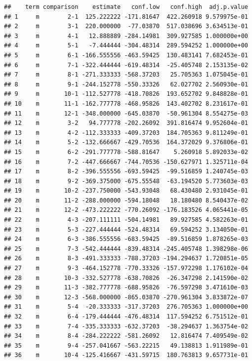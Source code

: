 \documentclass[]{book}
\theoremstyle{definition}
\theoremstyle{definition}
\theoremstyle{remark}
\begin{document}
\begin{verbatim}
##    term comparison    estimate   conf.low   conf.high  adj.p.value
## 1     m        2-1  125.222222 -171.81647  422.260918 9.579975e-01
## 2     m        3-1  220.000000  -77.03870  517.038696 3.634513e-01
## 3     m        4-1   12.888889 -284.14981  309.927585 1.000000e+00
## 4     m        5-1   -7.444444 -304.48314  289.594252 1.000000e+00
## 5     m        6-1 -166.555556 -463.59425  130.483141 7.682453e-01
## 6     m        7-1 -322.444444 -619.48314  -25.405748 2.153135e-02
## 7     m        8-1 -271.333333 -568.37203   25.705363 1.075045e-01
## 8     m        9-1 -244.152778 -550.33326   62.027702 2.560930e-01
## 9     m       10-1 -112.527778 -418.70826  193.652702 9.848828e-01
## 10    m       11-1 -162.777778 -468.95826  143.402702 8.231617e-01
## 11    m       12-1 -348.000000 -645.03870  -50.961304 8.554275e-03
## 12    m        3-2   94.777778 -202.26092  391.816474 9.952604e-01
## 13    m        4-2 -112.333333 -409.37203  184.705363 9.811249e-01
## 14    m        5-2 -132.666667 -429.70536  164.372029 9.376806e-01
## 15    m        6-2 -291.777778 -588.81647    5.260918 5.892033e-02
## 16    m        7-2 -447.666667 -744.70536 -150.627971 1.325711e-04
## 17    m        8-2 -396.555556 -693.59425  -99.516859 1.240745e-03
## 18    m        9-2 -369.375000 -675.55548  -63.194520 5.773603e-03
## 19    m       10-2 -237.750000 -543.93048   68.430480 2.931045e-01
## 20    m       11-2 -288.000000 -594.18048   18.180480 8.540437e-02
## 21    m       12-2 -473.222222 -770.26092 -176.183526 4.065441e-05
## 22    m        4-3 -207.111111 -504.14981   89.927585 4.582263e-01
## 23    m        5-3 -227.444444 -524.48314   69.594252 3.134050e-01
## 24    m        6-3 -386.555556 -683.59425  -89.516859 1.878265e-03
## 25    m        7-3 -542.444444 -839.48314 -245.405748 1.398298e-06
## 26    m        8-3 -491.333333 -788.37203 -194.294637 1.720851e-05
## 27    m        9-3 -464.152778 -770.33326 -157.972298 1.176102e-04
## 28    m       10-3 -332.527778 -638.70826  -26.347298 2.141590e-02
## 29    m       11-3 -382.777778 -688.95826  -76.597298 3.471610e-03
## 30    m       12-3 -568.000000 -865.03870 -270.961304 3.833872e-07
## 31    m        5-4  -20.333333 -317.37203  276.705363 1.000000e+00
## 32    m        6-4 -179.444444 -476.48314  117.594252 6.751512e-01
## 33    m        7-4 -335.333333 -632.37203  -38.294637 1.363754e-02
## 34    m        8-4 -284.222222 -581.26092   12.816474 7.409549e-02
## 35    m        9-4 -257.041667 -563.22215   49.138813 1.911989e-01
## 36    m       10-4 -125.416667 -431.59715  180.763813 9.657731e-01

\end{verbatim}
\end{document}
